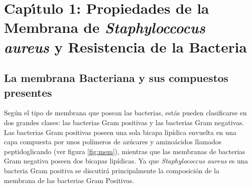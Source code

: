 \chapter{Cap\'{\i}tulo 1: Propiedades de la Membrana de  \textit{Staphyloccocus aureus} y Resistencia de la Bacteria}
\section{La membrana Bacteriana y sus compuestos presentes}\label{ss:mem}
Seg\'{u}n el tipo de membrana que posean las bacterias, est\'{a}s pueden clasificarse en dos grandes clases: las bacterias Gram positivas y las bacterias Gram negativas. Las bacterias Gram positivas poseen una sola bicapa lip\'{i}dica envuelta en una capa compuesta por unos pol\'{i}meros de az\'{u}cares y amino\'{a}cidos llamados peptidoglicando (ver figura \ref{fig:mem}), mientras que las membranas de bacterias Gram negativa poseen dos bicapas lip\'{i}dicas. Ya que \textit{Staphylococcus aureus} es una bacteria Gram positiva se discutir\'{a} principalmente la composici\'{o}n de la membrana de las bacterias Gram Positivas.\\

